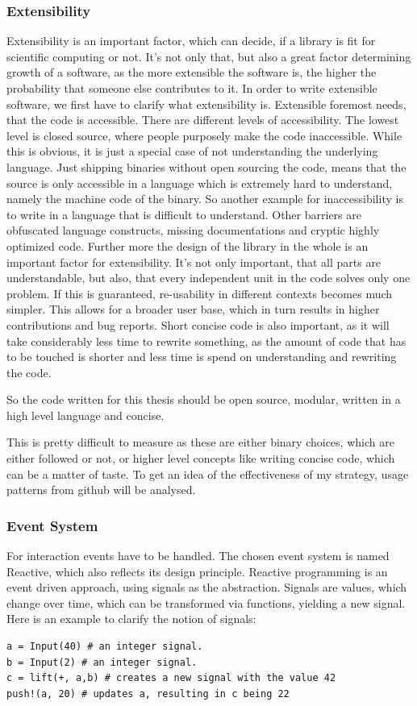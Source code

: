 \subsubsection{Extensibility}
Extensibility is an important factor, which can decide, if a library is fit for scientific computing or not. 
It's not only that, but also a great factor determining growth of a software, as the more extensible the software is, the higher the probability that someone else contributes to it.
In order to write extensible software, we first have to clarify what extensibility is.
Extensible foremost needs, that the code is accessible. There are different levels of accessibility. The lowest level is closed source, where people purposely make the code inaccessible. While this is obvious, it is just a special case of not understanding the underlying language. Just shipping binaries without open sourcing the code, means that the source is only accessible in a language which is extremely hard to understand, namely the machine code of the binary. So another example for inaccessibility is to write in a language that is difficult to understand. Other barriers are obfuscated language constructs, missing documentations and cryptic highly optimized code.
Further more the design of the library in the whole is an important factor for extensibility. It's not only important, that all parts are understandable, but also, that every independent unit in the code solves only one problem.
If this is guaranteed, re-usability in different contexts becomes much simpler. This allows for a broader user base, which in turn results in higher contributions and bug reports.
Short concise code is also important, as it will take considerably less time to rewrite something, as the amount of code that has to be touched is shorter and less time is spend on understanding and rewriting the code.

So the code written for this thesis should be open source, modular, written in a high level language and concise.

This is pretty difficult to measure as these are either binary choices, which are either followed or not, 
or higher level concepts like writing concise code, which can be a matter of taste.
To get an idea of the effectiveness of my strategy, usage patterns from github will be analysed.

\subsubsection{Event System}
For interaction events have to be handled. The chosen event system is named Reactive, which also reflects its design principle.
Reactive programming is an event driven approach, using signals as the abstraction. 
Signals are values, which change over time, which can be transformed via functions, yielding a new signal.
Here is an example to clarify the notion of signals:
\begin{lstlisting}
a = Input(40) # an integer signal.
b = Input(2) # an integer signal.
c = lift(+, a,b) # creates a new signal with the value 42
push!(a, 20) # updates a, resulting in c being 22
\end{lstlisting}

